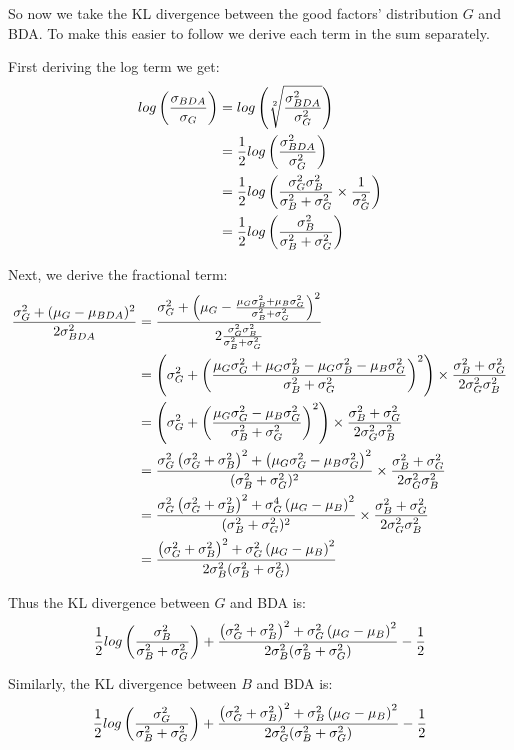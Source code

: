 So now we take the KL divergence between the good factors' distribution $G$ and BDA. To make this easier to follow we derive each term in the sum separately.

First deriving the log term we get:
\begin{align}
	log\left(\frac{\sigma_{BDA}}{\sigma_{G}}\right)
	&= log\left(\sqrt[2]{\frac{\sigma_{BDA}^2}{\sigma_{G}^2}}\right)\\
	&= \frac{1}{2} log\left(\frac{\sigma_{BDA}^2}{\sigma_{G}^2}\right)\\
	&= \frac{1}{2} log\left(\frac{\sigma_G^2 \sigma_B^2}{\sigma_B^2 + \sigma_G^2} \times \frac{1}{\sigma_G^2}\right)\\
	&= \frac{1}{2} log\left(\frac{\sigma_B^2}{\sigma_B^2 + \sigma_G^2}\right)
\end{align}

Next, we derive the fractional term:
\begin{align}
	\frac{\sigma_{G}^2 + (\mu_{G} - \mu_{BDA})^2}{2\sigma_{BDA}^2}
	&= \frac{
			\sigma_G^2 + \left(\mu_G - \frac{\mu_G\sigma_B^2 + \mu_B\sigma_G^2}{\sigma_B^2 + \sigma_G^2}\right)^2
		}{
			2 \frac{\sigma_G^2 \sigma_B^2}{\sigma_B^2 + \sigma_G^2}
		}\\
	&= \left(\sigma_G^2 + \left(\frac{\mu_G\sigma_G^2 + \mu_G\sigma_B^2 - \mu_G\sigma_B^2 - \mu_B\sigma_G^2}{\sigma_B^2 + \sigma_G^2}\right)^2\right) \times \frac{\sigma_B^2 + \sigma_G^2}{2\sigma_G^2\sigma_B^2}\\
	&= \left(\sigma_G^2 + \left(\frac{\mu_G\sigma_G^2 - \mu_B\sigma_G^2}{\sigma_B^2 + \sigma_G^2}\right)^2\right) \times \frac{\sigma_B^2 + \sigma_G^2}{2\sigma_G^2\sigma_B^2}\\
	&= \frac{\sigma_G^2\left(\sigma_G^2 + \sigma_B^2\right)^2 + \left(\mu_G\sigma_G^2 - \mu_B\sigma_G^2\right)^2}{(\sigma_B^2 + \sigma_G^2)^2} \times \frac{\sigma_B^2 + \sigma_G^2}{2\sigma_G^2\sigma_B^2}\\
	&= \frac{\sigma_G^2\left(\sigma_G^2 + \sigma_B^2\right)^2 + \sigma_G^4\left(\mu_G - \mu_B\right)^2}{(\sigma_B^2 + \sigma_G^2)^2} \times \frac{\sigma_B^2 + \sigma_G^2}{2\sigma_G^2\sigma_B^2}\\
	&= \frac{\left(\sigma_G^2 + \sigma_B^2\right)^2 + \sigma_G^2\left(\mu_G - \mu_B\right)^2}{2\sigma_B^2(\sigma_B^2 + \sigma_G^2)}
\end{align}

Thus the KL divergence between $G$ and BDA is:
\begin{equation}
	\frac{1}{2} log\left(\frac{\sigma_B^2}{\sigma_B^2 + \sigma_G^2}\right) + \frac{\left(\sigma_G^2 + \sigma_B^2\right)^2 + \sigma_G^2\left(\mu_G - \mu_B\right)^2}{2\sigma_B^2(\sigma_B^2 + \sigma_G^2)} - \frac{1}{2}
\end{equation}

Similarly, the KL divergence between $B$ and BDA is:
\begin{equation}
	\frac{1}{2} log\left(\frac{\sigma_G^2}{\sigma_B^2 + \sigma_G^2}\right) + \frac{\left(\sigma_G^2 + \sigma_B^2\right)^2 + \sigma_B^2\left(\mu_G - \mu_B\right)^2}{2\sigma_G^2(\sigma_B^2 + \sigma_G^2)} - \frac{1}{2}
\end{equation}

